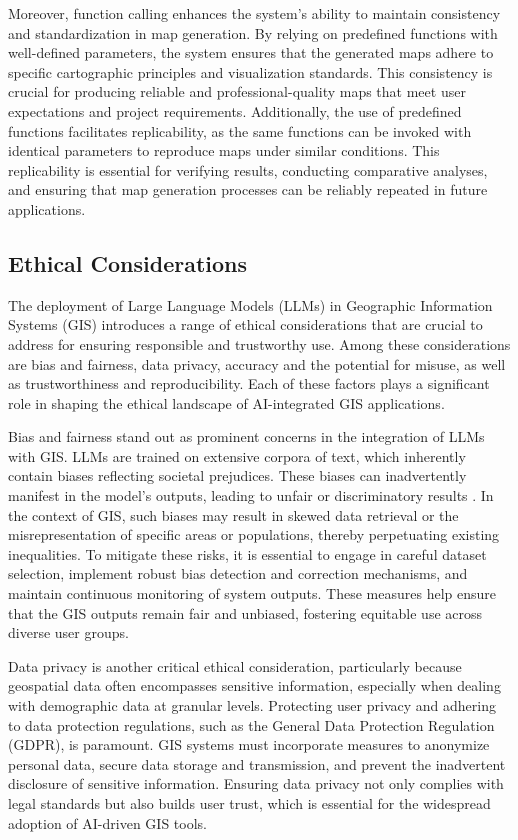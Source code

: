 Moreover, function calling enhances the system's ability to maintain consistency and standardization in map generation. By relying on predefined functions with well-defined parameters, the system ensures that the generated maps adhere to specific cartographic principles and visualization standards. This consistency is crucial for producing reliable and professional-quality maps that meet user expectations and project requirements. Additionally, the use of predefined functions facilitates replicability, as the same functions can be invoked with identical parameters to reproduce maps under similar conditions. This replicability is essential for verifying results, conducting comparative analyses, and ensuring that map generation processes can be reliably repeated in future applications.

\subsection{Ethical Considerations}

The deployment of Large Language Models (LLMs) in Geographic Information Systems (GIS) introduces a range of ethical considerations that are crucial to address for ensuring responsible and trustworthy use. Among these considerations are bias and fairness, data privacy, accuracy and the potential for misuse, as well as trustworthiness and reproducibility. Each of these factors plays a significant role in shaping the ethical landscape of AI-integrated GIS applications.

Bias and fairness stand out as prominent concerns in the integration of LLMs with GIS. LLMs are trained on extensive corpora of text, which inherently contain biases reflecting societal prejudices. These biases can inadvertently manifest in the model's outputs, leading to unfair or discriminatory results \cite{wang_aligning_2023, gallegos_bias_2024}. In the context of GIS, such biases may result in skewed data retrieval or the misrepresentation of specific areas or populations, thereby perpetuating existing inequalities. To mitigate these risks, it is essential to engage in careful dataset selection, implement robust bias detection and correction mechanisms, and maintain continuous monitoring of system outputs. These measures help ensure that the GIS outputs remain fair and unbiased, fostering equitable use across diverse user groups.

Data privacy is another critical ethical consideration, particularly because geospatial data often encompasses sensitive information, especially when dealing with demographic data at granular levels. Protecting user privacy and adhering to data protection regulations, such as the General Data Protection Regulation (GDPR), is paramount. GIS systems must incorporate measures to anonymize personal data, secure data storage and transmission, and prevent the inadvertent disclosure of sensitive information. Ensuring data privacy not only complies with legal standards but also builds user trust, which is essential for the widespread adoption of AI-driven GIS tools.

